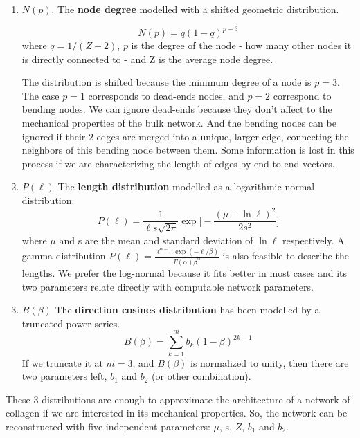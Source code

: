 \begin{enumerate}
\item \textbf{$N(p)$}. The \textbf{node degree} modelled with a shifted geometric
distribution.

\begin{equation} \label{degree-dist}
N(p)=q(1-q)^{p-3}
\end{equation}
where $q=1/(Z-2)$, $p$ is the degree of the node - how many other nodes it is directly connected to - and Z is the average node degree.

The distribution is shifted because the minimum degree of a node is
$p=3$. The case $p=1$ corresponds to dead-ends nodes, and $p=2$ correspond to
bending nodes. We can ignore dead-ends because they don't affect to the mechanical properties of the bulk network. And the bending nodes
can be ignored if their $2$ edges are merged into a unique, larger edge,
connecting the neighbors of this bending node between them. Some information is lost in this
process if we are characterizing the length of edges by end to end
vectors.

\item \textbf{$P(\ell)$} The \textbf{length distribution} modelled as a
logarithmic-normal distribution.
\begin{equation} \label{length-dist}
P(\ell)=\frac{1}{\ell
s\sqrt{2\pi}}\exp{\bigg[-\frac{(\mu-\ln{\ell})^2}{2s^2}\bigg]}
\end{equation}
where $\mu$ and s are the mean and standard deviation of $\ln{\ell}$
respectively.
A gamma distribution \( P(\ell) = \frac{\ell^{\alpha - 1}\exp(-\ell/\beta)}{\Gamma(\alpha)\beta^\alpha} \) is also feasible to describe the lengths. We prefer the log-normal because it fits better in most cases and its two parameters
relate directly with computable network parameters.

\item \textbf{$B(\beta)$} The \textbf{direction cosines distribution} has been modelled by
  a truncated power series.
\begin{equation} \label{cosines-dist}
B(\beta)=\sum_{k=1}^{m} b_k(1-\beta)^{2k-1}
\end{equation}
If we truncate it at $m=3$, and $B(\beta)$ is normalized to unity, then there
are two parameters left, $b_1$ and $b_2$ (or other combination).
\end{enumerate}

These $3$ distributions are enough to approximate the architecture of a
network of collagen if we are interested in its mechanical properties.
So, the network can be reconstructed with five
independent parameters:
$\mu$, s, $Z$, $b_1$ and $b_2$.


